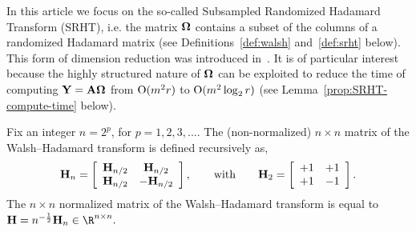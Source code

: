 In this article we focus on the so-called Subsampled Randomized Hadamard Transform (SRHT), i.e. the matrix
${\bm{\mathrm{\Omega}}}$ contains a subset of the columns of a randomized Hadamard matrix (see Definitions~\ref{def:walsh} and~\ref{def:srht} below).
This form of dimension reduction was introduced in~\cite{AC06}.
It is of particular interest because the highly structured nature of ${\bm{\mathrm{\Omega}}}$ can be
exploited to reduce the time of computing ${\bm{\mathrm{Y}}} = {\bm{\mathrm{A}}} {\bm{\mathrm{\Omega}}}$ from $\mathrm{O}(m^2r)$ to $\mathrm{O}(m^2\log_2 r)$
(see Lemma~\ref{prop:SRHT-compute-time} below).

\begin{definition}
\label{def:walsh}
Fix an integer $n = 2^p$, for $p = 1,2,3, ...$. The (non-normalized) $n \times n$ matrix of the Walsh--Hadamard transform is defined recursively as,
\vspace{-.0751in}
%
$$ \matH_n = \left[
\begin{array}{cc}
  \matH_{n/2} &  \matH_{n/2} \\
  \matH_{n/2} & -\matH_{n/2}
\end{array}\right],
%
\qquad \mbox{with} \qquad
%
\matH_2 = \left[
\begin{array}{cc}
  +1 & +1 \\
  +1 & -1
\end{array}\right].
$$
%
The $n \times n$ normalized matrix of the Walsh--Hadamard transform is equal to $\matH = n^{-\frac{1}{2}} \matH_n \in \R^{n \times n}.$
\end{definition}

